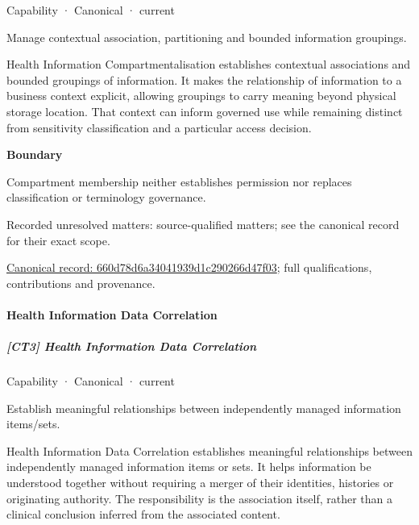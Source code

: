 \label{element:660d78d6a34041939d1c290266d47f03}
{\small Capability · Canonical · current}\par

Manage contextual association, partitioning and bounded information groupings.



Health Information Compartmentalisation establishes contextual associations and bounded groupings of information. It makes the relationship of information to a business context explicit, allowing groupings to carry meaning beyond physical storage location. That context can inform governed use while remaining distinct from sensitivity classification and a particular access decision.



\textbf{Boundary}



Compartment membership neither establishes permission nor replaces classification or terminology governance.


{\small Recorded unresolved matters: source-qualified matters; see the canonical record for their exact scope.}\par
{\footnotesize \href{../../../../continuum/strategy/capability/660d78d6a34041939d1c290266d47f03.md}{Canonical record: 660d78d6a34041939d1c290266d47f03}; full qualifications, contributions and provenance.}\par
\paragraph{Health Information Data Correlation}

\subparagraph{[CT3] Health Information Data Correlation}

\label{element:6c41e90a8cf24ed689d9d6a363c8d3fe}
{\small Capability · Canonical · current}\par

Establish meaningful relationships between independently managed information items/sets.



Health Information Data Correlation establishes meaningful relationships between independently managed information items or sets. It helps information be understood together without requiring a merger of their identities, histories or originating authority. The responsibility is the association itself, rather than a clinical conclusion inferred from the associated content.



